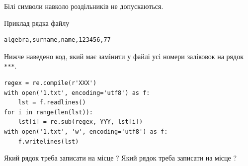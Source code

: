 \documentclass[12pt, ukrainian]{article}
\def\code#1{\Verb!#1!}
\begin{document}
{Білі символи навколо роздільників не допускаються.

Приклад рядка файлу



\begin{verbatim}
algebra,surname,name,123456,77
\end{verbatim}


Нижче наведено код, який має замінити у файлі усі номери заліковок на рядок \code{***}.



\begin{verbatim}
regex = re.compile(r'XXX')
with open('1.txt', encoding='utf8') as f:
    lst = f.readlines()
for i in range(len(lst)):
    lst[i] = re.sub(regex, YYY, lst[i])
with open('1.txt', 'w', encoding='utf8') as f:
    f.writelines(lst)
\end{verbatim}





Який рядок треба записати на місце  ?
Який рядок треба записати на місце  ?\par

}
\newpage

\end{document}
